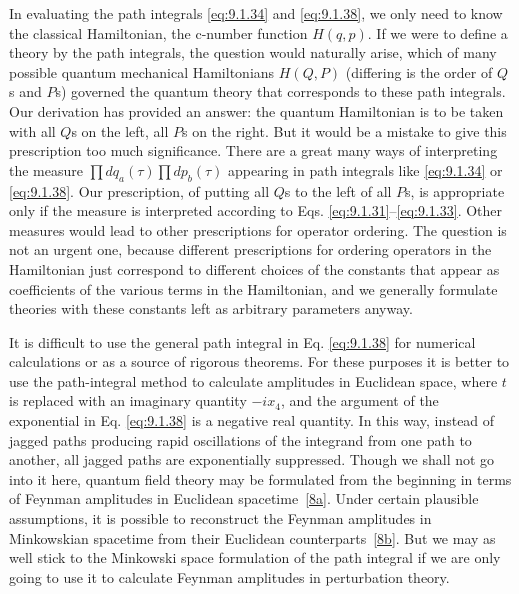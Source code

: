 In evaluating the path integrals \eqref{eq:9.1.34} and \eqref{eq:9.1.38}, we only need to know
the classical Hamiltonian, the c-number function $H(q,p)$. If we were to
define a theory by the path integrals, the question would naturally arise,
which of many possible quantum mechanical Hamiltonians $H(Q,P)$
(differing is the order of $Q$s and $P$s) governed the quantum theory that
corresponds to these path integrals. Our derivation has provided an answer:
the quantum Hamiltonian is to be taken with all $Q$s on the left, all $P$s
on the right. But it would be a mistake to give this prescription too much
significance. There are a great many ways of interpreting the measure
$\prod dq_a(\tau)\prod dp_b(\tau)$ appearing in path integrals like
\eqref{eq:9.1.34} or \eqref{eq:9.1.38}. Our prescription, of putting all $Q$s to the left of all
$P$s, is appropriate only if the measure is interpreted according to
Eqs. \eqref{eq:9.1.31}--\eqref{eq:9.1.33}. Other measures would lead to other prescriptions
for operator ordering. The question is not an urgent one, because different
prescriptions for ordering operators in the Hamiltonian just correspond to
different choices of the constants that appear as coefficients of the various
terms in the Hamiltonian, and we generally formulate theories with these
constants left as arbitrary parameters anyway.

It is difficult to use the general path integral in Eq. \eqref{eq:9.1.38} for numerical
calculations or as a source of rigorous theorems. For these purposes it is
better to use the path-integral method to calculate amplitudes in Euclidean
space, where $t$ is replaced with an imaginary quantity $-ix_4$, and the
argument of the exponential in Eq. \eqref{eq:9.1.38} is a negative real quantity. In
this way, instead of jagged paths producing rapid oscillations of the
integrand from one path to another, all jagged paths are exponentially
suppressed. Though we shall not go into it here, quantum field theory may
be formulated from the beginning in terms of Feynman amplitudes in
Euclidean spacetime~\hyperref[ref:9.8a]{[8a]}. Under certain plausible assumptions, it is possible
to reconstruct the Feynman amplitudes in Minkowskian spacetime from their
Euclidean counterparts~\hyperref[ref:9.8b]{[8b]}. But we may as well stick to the Minkowski
space formulation of the path integral if we are only going to use it to
calculate Feynman amplitudes in perturbation theory.
